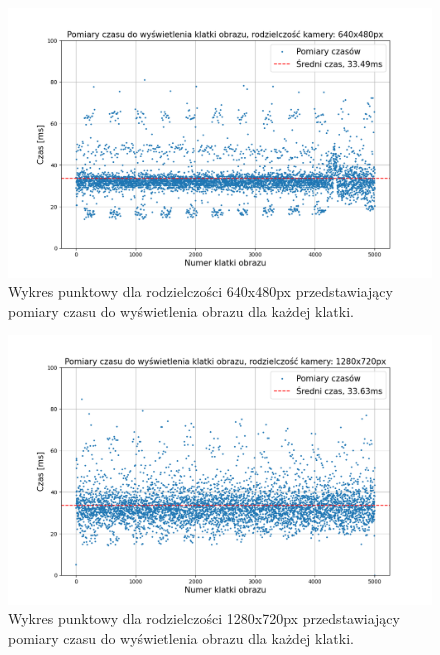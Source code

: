 \begin{figure}[H]
    \centering
    \includegraphics[width=\linewidth]{r_test_szybkosci/punkty/2.png}
    \caption{Wykres punktowy dla rodzielczości 640x480px przedstawiający pomiary czasu do wyświetlenia obrazu dla każdej klatki.}
    \label{fig:czas-punktowy2}    
\end{figure}

\begin{figure}[H]
    \centering
    \includegraphics[width=\linewidth]{r_test_szybkosci/punkty/3.png}
    \caption{Wykres punktowy dla rodzielczości 1280x720px przedstawiający pomiary czasu do wyświetlenia obrazu dla każdej klatki.}
    \label{fig:czas-punktowy3}    
\end{figure}


